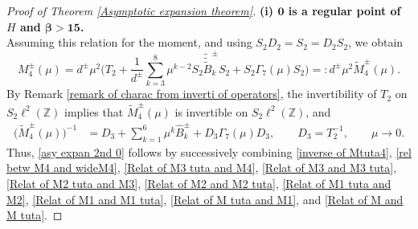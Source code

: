 \documentclass[reqno, 11pt]{amsart}
\newcommand\Z{\mathbb{Z}}
\numberwithin{equation}{section}
\begin{document}
\begin{proof}[Proof of Theorem {\rm\ref{Asymptotic expansion theorem}}]{\bf{(i) ${\bm{0}}$ is a regular point of $H$ and {$\bm{\beta>15}$}.}}
\begin{equation}
\end{equation}
Assuming this relation for the moment, and using $S_2D_2=S_2=D_2S_2$, we obtain
\begin{equation}\label{rel betw M4 and wideM4}
M^{\pm}_4(\mu)=d^{\pm}\mu^2\Big(T_2+\frac{1}{d^{\pm}}\sum\limits_{k=3}^{8}\mu^{k-2}S_2\tilde{\tilde{\tilde{B}}}^{\pm}_{k}S_2+S_2\Gamma_7(\mu)S_2\Big)=:d^{\pm}\mu^2\widetilde{M}^{\pm}_4(\mu).
\end{equation}
By Remark \ref{remark of charac from inverti of operators}, the invertibility of $T_2$ on $S_2\ell^2(\Z)$ implies that $\widetilde{M}^{\pm}_4(\mu)$ is invertible on $S_2\ell^2(\Z)$, and
\begin{align}\label{inverse of Mtuta4}
\big(\widetilde{M}_{4}^{\pm}(\mu)\big)^{-1}
&=D_3+\sum\limits_{k=1}^{6}\mu^k\hat{B}^{\pm}_{k}+D_3\Gamma_7(\mu)D_3,\qquad D_3=T^{-1}_2,\qquad \mu\rightarrow0.
\end{align}
Thus, \eqref{asy expan 2nd 0} follows by successively combining \eqref{inverse of Mtuta4}, \eqref{rel betw M4 and wideM4}, \eqref{Relat of M3 tuta and M4}, \eqref{Relat of M3 and M3 tuta}, \eqref{Relat of M2 tuta and M3}, \eqref{Relat of M2 and M2 tuta}, \eqref{Relat of M1 tuta and M2}, \eqref{Relat of M1 and M1 tuta}, \eqref{Relat of M tuta and M1}, and \eqref{Relat of M and M tuta}.


\end{proof}
\end{document}
